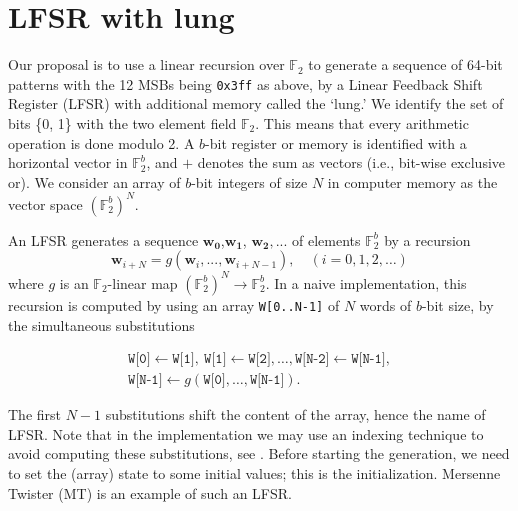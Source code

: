 \documentclass{svmult}
\begin{document}
\section{LFSR with lung}
\label{sec:pulmonary}
Our proposal is to use a linear recursion over ${\mathbb F}_2$
to generate a sequence of 64-bit patterns with
the 12 MSBs being \texttt{0x3ff} as above,
by a Linear Feedback Shift Register (LFSR)
with additional memory called the `lung.'
We identify the set of bits \{0, 1\} with the two element field ${\mathbb F}_2$.
This means that every arithmetic operation is done modulo 2.
A $b$-bit register or memory is identified with a horizontal
vector in ${\mathbb F}_2^b$, and $+$ denotes the sum as vectors (i.e.,
bit-wise exclusive or). We consider an array of $b$-bit integers of
size $N$ in
computer memory as the vector space $({\mathbb F}_2^{b})^N$.

An LFSR generates a sequence $\mathbf{w_0}$,$\mathbf{w_1}$,
$\mathbf{w_2},...$ of elements ${\mathbb F}_2^b$ by a recursion
\[ \mathbf{w}_{i+N} = g(\mathbf{w}_{i}, ..., \mathbf{w}_{i + N-1}),
\quad (i=0,1,2,\ldots)
\]
where $g$ is an ${\mathbb F}_2$-linear map $({\mathbb F}_2^{b})^N \rightarrow
{\mathbb F}_2^b$.  In a naive implementation, this recursion is computed by using
an array \texttt{W[0..N-1]} of $N$ words of $b$-bit size, by the
simultaneous substitutions

\begin{multline*}
    \texttt{W[0]} \leftarrow \texttt{W[1]},\
    \texttt{W[1]} \leftarrow \texttt{W[2]}, \ldots,
    \texttt{W[N-2]} \leftarrow \texttt{W[N-1]}, \\
    \texttt{W[N-1]} \leftarrow
    g(\texttt{W[0]},\ldots,\texttt{W[N-1]}).
  \end{multline*}

The first $N-1$ substitutions shift the content of the array, hence
the name of LFSR.  Note that in the implementation we may use an
indexing technique to avoid computing these substitutions, see
\cite[P.28 Algorithm A]{knuth:bible}.  Before starting the generation,
we need to set the (array) state to some initial values; this is the
initialization. Mersenne Twister \cite{MT} (MT) is an example of such
an LFSR.
\end{document}
